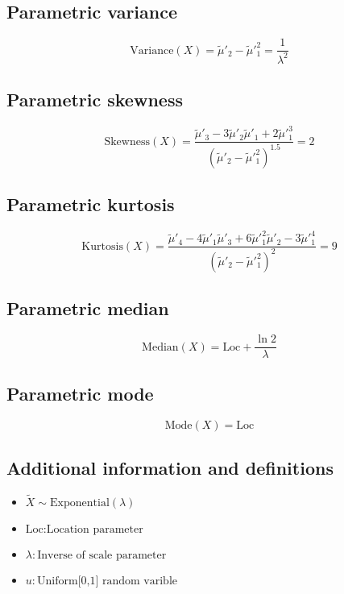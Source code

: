 \documentclass{article}
\begin{document}
\subsection{Parametric variance}
\begin{equation*} \mathrm{Variance}(X)=\tilde{\mu}'_{2}-\tilde{\mu}'^{2}_{1}=\frac{1}{\lambda^2} \end{equation*}
\subsection{Parametric skewness}
\begin{equation*} \mathrm{Skewness}(X)=\frac{\tilde{\mu}'_{3}-3\tilde{\mu}'_{2}\tilde{\mu}'_{1}+2\tilde{\mu}'^{3}_{1}}{(\tilde{\mu}'_{2}-\tilde{\mu}'^{2}_{1})^{1.5}}=2 \end{equation*}
\subsection{Parametric kurtosis}
\begin{equation*} \mathrm{Kurtosis}(X)=\frac{\tilde{\mu}'_{4}-4\tilde{\mu}'_{1}\tilde{\mu}'_{3}+6\tilde{\mu}'^{2}_{1}\tilde{\mu}'_{2}-3\tilde{\mu}'^{4}_{1}}{(\tilde{\mu}'_{2}-\tilde{\mu}'^{2}_{1})^{2}}=9 \end{equation*}
\subsection{Parametric median}
\begin{equation*} \mathrm{Median}(X)=\text{Loc}+\frac{\ln 2}{\lambda} \end{equation*}
\subsection{Parametric mode}
\begin{equation*} \mathrm{Mode}(X)=\text{Loc} \end{equation*}
\subsection{Additional information and definitions}
\begin{itemize}
    \item $ \tilde{X}\sim\mathrm{Exponential}\left(\lambda\right) $
    \item $ \text{Loc}:\text{Location parameter} $
    \item $ \lambda:\text{Inverse of scale parameter} $
    \item $ u:\text{Uniform[0,1] random varible} $
\end{itemize}
\end{document}
